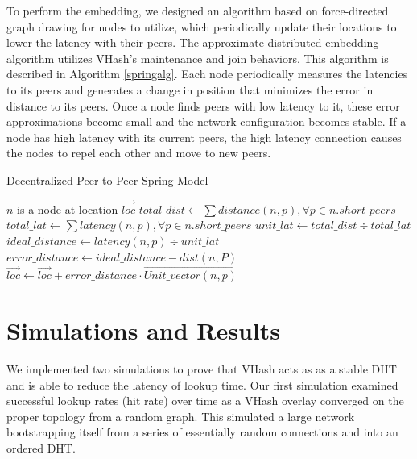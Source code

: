 \documentclass[10pt, conference, letterpaper]{IEEEtran}
\begin{document}
To perform the embedding, we designed an algorithm based on force-directed graph drawing \cite{Spring} for nodes to utilize, which periodically update their locations to lower the latency with their peers.
The approximate distributed embedding algorithm utilizes VHash's maintenance and join behaviors.
This algorithm is described in Algorithm \ref{springalg}. Each node periodically measures the latencies to its peers and generates a change in position that minimizes the error in distance to its peers.
Once a node finds peers with low latency to it, these error approximations become small and the network configuration becomes stable.
If a node has high latency with its current peers, the high latency connection causes the nodes to repel each other and move to new peers.

\begin{algorithm}
\caption{Decentralized Peer-to-Peer Spring Model}
\label{springalg}
\begin{algorithmic}[1] 
	\STATE $n$ is a node at location $\overrightarrow{loc}$
    \STATE $total\_dist \leftarrow \sum distance(n,p),\forall p \in n.short\_peers$
    \STATE $total\_lat \leftarrow \sum latency(n,p),\forall p \in n.short\_peers$
    \STATE $unit\_lat \leftarrow total\_dist \div total\_lat$
    	\STATE $ideal\_distance \leftarrow latency(n,p) \div unit\_lat$
        \STATE $error\_distance \leftarrow ideal\_distance - dist(n,P)$
        \STATE $\overrightarrow{loc} \leftarrow \overrightarrow{loc} + error\_distance \cdot \overrightarrow{Unit\_vector(n,p)} $
    \ENDFOR
\end{algorithmic}
\end{algorithm}






\section{Simulations and Results}
\label{simSection}
We implemented two simulations to prove that VHash acts as as a stable DHT and is able to reduce the latency of lookup time.
Our first simulation examined successful lookup rates (hit rate) over time as a VHash overlay converged on the proper topology from a random graph.  
This simulated a large network bootstrapping itself from a series of essentially random connections and into an ordered DHT.
  
\end{document}

